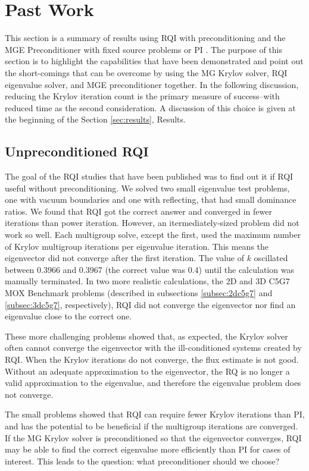 \documentclass[preprint,12pt]{elsarticle}
\begin{document}
\section{Past Work}
\label{sec:pastwork}
This section is a summary of results using RQI with preconditioning \cite{Slaybaugh2012} and the MGE Preconditioner with fixed source problems or PI \cite{Slaybaugh2013}. The purpose of this section is to highlight the capabilities that have been demonstrated and point out the short-comings that can be overcome by using the MG Krylov solver, RQI eigenvalue solver, and MGE preconditioner together. In the following discussion, reducing the Krylov iteration count is the primary measure of success--with reduced time as the second consideration. A discussion of this choice is given at the beginning of the Section \ref{sec:results}, Results.

\subsection{Unpreconditioned RQI}
The goal of the RQI studies that have been published was to find out it if RQI useful without preconditioning. We solved two small eigenvalue test problems, one with vacuum boundaries and one with reflecting, that had small dominance ratios. We found that RQI got the correct answer and converged in fewer iterations than power iteration. However, an itermediately-sized problem did not work so well. Each multigroup solve, except the first, used the maximum number of Krylov multigroup iterations per eigenvalue iteration. This means the eigenvector did not converge after the first iteration. The value of $k$ oscillated between 0.3966 and 0.3967 (the correct value was 0.4) until the calculation was manually terminated. In two more realistic calculations, the 2D and 3D C5G7 MOX Benchmark problems (described in subsections \ref{subsec:2dc5g7} and \ref{subsec:3dc5g7}, respectively), RQI did not converge the eigenvector nor find an eigenvalue close to the correct one. 

These more challenging problems showed that, as expected, the Krylov solver often cannot converge the eigenvector with the ill-conditioned systems created by RQI. When the Krylov iterations do not converge, the flux estimate is not good. Without an adequate approximation to the eigenvector, the RQ is no longer a valid approximation to the eigenvalue, and therefore the eigenvalue problem does not converge. 

The small problems showed that RQI can require fewer Krylov iterations than PI, and has the potential to be beneficial if the multigroup iterations are converged. If the MG Krylov solver is preconditioned so that the eigenvector converges, RQI may be able to find the correct eigenvalue more efficiently than PI for cases of interest. This leads to the question: what preconditioner should we choose?
\end{document}

